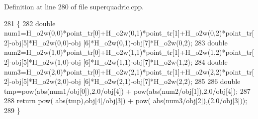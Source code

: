 Definition at line 280 of file superquadric.\+cpp.


\begin{DoxyCode}
281  \{
282      \textcolor{keywordtype}{double} num1=H\_o2w(0,0)*point\_tr[0]+H\_o2w(0,1)*point\_tr[1]+H\_o2w(0,2)*point\_tr[2]-obj[5]*H\_o2w(0,0)-obj
      [6]*H\_o2w(0,1)-obj[7]*H\_o2w(0,2);
283      \textcolor{keywordtype}{double} num2=H\_o2w(1,0)*point\_tr[0]+H\_o2w(1,1)*point\_tr[1]+H\_o2w(1,2)*point\_tr[2]-obj[5]*H\_o2w(1,0)-obj
      [6]*H\_o2w(1,1)-obj[7]*H\_o2w(1,2);
284      \textcolor{keywordtype}{double} num3=H\_o2w(2,0)*point\_tr[0]+H\_o2w(2,1)*point\_tr[1]+H\_o2w(2,2)*point\_tr[2]-obj[5]*H\_o2w(2,0)-obj
      [6]*H\_o2w(2,1)-obj[7]*H\_o2w(2,2);
285 
286      \textcolor{keywordtype}{double} tmp=pow(abs(num1/obj[0]),2.0/obj[4]) + pow(abs(num2/obj[1]),2.0/obj[4]);
287 
288      \textcolor{keywordflow}{return} pow( abs(tmp),obj[4]/obj[3]) + pow( abs(num3/obj[2]),(2.0/obj[3]));
289  \}
\end{DoxyCode}
